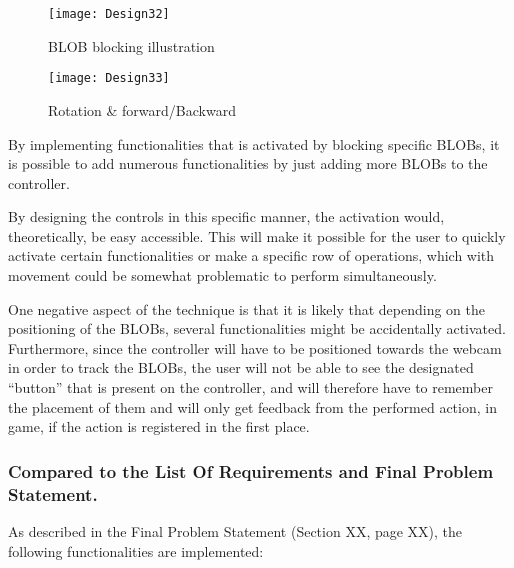 \begin{figure}[h]
\centering
\caption{BLOB blocking illustration}
\label{fig:design32}
\texttt{[image: Design32]}
\end{figure}

\begin{figure}[h]
\centering
\texttt{[image: Design33]}
\caption{Rotation \& forward/Backward}
\label{fig:design33}
\end{figure}

By implementing functionalities that is activated by blocking specific BLOBs, it is possible to add numerous functionalities by just adding more BLOBs to the controller. 

By designing the controls in this specific manner, the activation would, theoretically, be easy accessible. This will make it possible for the user to quickly activate certain functionalities or make a specific row of operations, which with movement could be somewhat problematic to perform simultaneously. 

One negative aspect of the technique is that it is likely that depending on the positioning of the BLOBs, several functionalities might be accidentally activated. Furthermore, since the controller will have to be positioned towards the webcam in order to track the BLOBs, the user will not be able to see the designated “button” that is present on the controller, and will therefore have to remember the placement of them and will only get feedback from the performed action, in game, if the action is registered in the first place.


\subsubsection*{Compared to the List Of Requirements and Final Problem Statement.}
As described in the Final Problem Statement (Section XX, page XX), the following functionalities are implemented:

